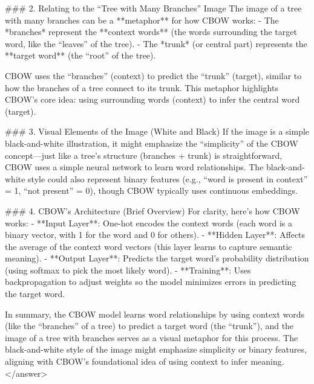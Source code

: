 ### 2. Relating to the “Tree with Many Branches” Image  
The image of a tree with many branches can be a **metaphor** for how CBOW works:  
- The *branches* represent the **context words** (the words surrounding the target word, like the “leaves” of the tree).  
- The *trunk* (or central part) represents the **target word** (the “root” of the tree).  

CBOW uses the “branches” (context) to predict the “trunk” (target), similar to how the branches of a tree connect to its trunk. This metaphor highlights CBOW’s core idea: using surrounding words (context) to infer the central word (target).  


### 3. Visual Elements of the Image (White and Black)  
If the image is a simple black-and-white illustration, it might emphasize the “simplicity” of the CBOW concept—just like a tree’s structure (branches + trunk) is straightforward, CBOW uses a simple neural network to learn word relationships. The black-and-white style could also represent binary features (e.g., “word is present in context” = 1, “not present” = 0), though CBOW typically uses continuous embeddings.  


### 4. CBOW’s Architecture (Brief Overview)  
For clarity, here’s how CBOW works:  
- **Input Layer**: One-hot encodes the context words (each word is a binary vector, with 1 for the word and 0 for others).  
- **Hidden Layer**: Affects the average of the context word vectors (this layer learns to capture semantic meaning).  
- **Output Layer**: Predicts the target word’s probability distribution (using softmax to pick the most likely word).  
- **Training**: Uses backpropagation to adjust weights so the model minimizes errors in predicting the target word.  


In summary, the CBOW model learns word relationships by using context words (like the “branches” of a tree) to predict a target word (the “trunk”), and the image of a tree with branches serves as a visual metaphor for this process. The black-and-white style of the image might emphasize simplicity or binary features, aligning with CBOW’s foundational idea of using context to infer meaning.</answer>